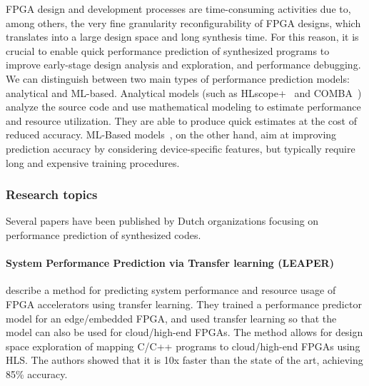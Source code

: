 FPGA design and development processes are time-consuming activities due to, among others, the very fine granularity reconfigurability of FPGA designs, which translates into a large design space and long synthesis time. For this reason, it is crucial to enable quick performance prediction of synthesized programs to improve early-stage design analysis and exploration, and performance debugging.
We can distinguish between two main types of performance prediction models: analytical and ML-based. Analytical models (such as HLscope+~\cite{hlscope-2017} and COMBA~\cite{comba-2020}) analyze the source code and use mathematical modeling to estimate performance and resource utilization. They are able to produce quick estimates at the cost of reduced accuracy. ML-Based models~\cite{oneal-2018, ustun-2020, Sun-2021}, on the other hand, %
aim at improving prediction accuracy by considering device-specific features, but typically %
require long and expensive training procedures. 



\subsubsection*{\bf{Research topics}} Several papers have been published by Dutch organizations focusing on performance prediction of synthesized codes.


\paragraph{System Performance Prediction via Transfer learning (LEAPER)}

\citet{Singha2022leaper} describe a method for predicting system performance and resource usage of FPGA accelerators using transfer learning.
They trained a performance predictor model for an edge/embedded FPGA, and used transfer learning so that the model can also be used for cloud/high-end FPGAs.
The method allows for design space exploration of mapping C/C++ programs to cloud/high-end FPGAs using HLS. The authors showed that it is 10x faster than the state of the art, achieving 85\% accuracy.

